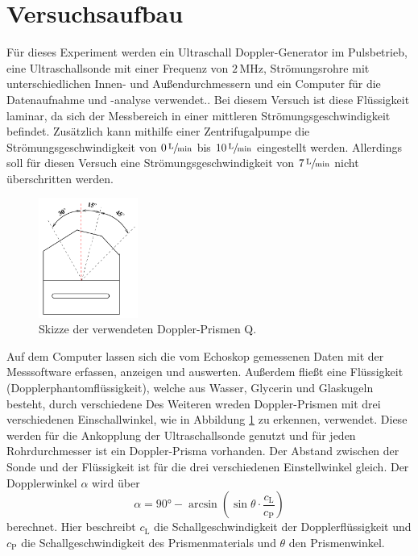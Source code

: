 \section{Versuchsaufbau}
\label{sec:Versuchsaufbau}
Für dieses Experiment werden ein Ultraschall Doppler-Generator im Pulsbetrieb, eine Ultraschallsonde mit einer Frequenz von $2\,\unit{\mega\hertz}$,
Strömungsrohre mit unterschiedlichen Innen- und Außendurchmessern und ein Computer für die Datenaufnahme und -analyse verwendet.. Bei diesem Versuch ist diese Flüssigkeit laminar, da sich der Messbereich in einer mittleren
Strömungsgeschwindigkeit befindet. Zusätzlich kann mithilfe einer Zentrifugalpumpe die Strömungsgeschwindigkeit von $0\,\sfrac{\unit{\liter}}{\unit{\minute}}$ bis $10\,\sfrac{\unit{\liter}}{\unit{\minute}}$
eingestellt werden. Allerdings soll für diesen Versuch eine Strömungsgeschwindigkeit von $7\,\sfrac{\unit{\liter}}{\unit{\minute}}$ nicht überschritten werden. 
\begin{figure}
    \centering
    \includegraphics[width=0.29\textwidth]{content/Bilder/Prisma.jpeg}
    \caption{Skizze der verwendeten Doppler-Prismen Q\cite{anleitungUS3}.}
    \label{fig:Prisma}
\end{figure}
Auf dem Computer lassen sich die vom Echoskop gemessenen Daten 
mit der Messsoftware erfassen, anzeigen und auswerten.  Außerdem fließt eine Flüssigkeit (Dopplerphantomflüssigkeit), welche aus Wasser, Glycerin und Glaskugeln besteht, durch verschiedene
Des Weiteren wreden Doppler-Prismen mit drei verschiedenen Einschallwinkel, wie in Abbildung \ref{fig:Prisma} zu erkennen, verwendet. Diese werden für die Ankopplung der Ultraschallsonde genutzt und für jeden Rohrdurchmesser
ist ein Doppler-Prisma vorhanden. Der Abstand zwischen der Sonde und der Flüssigkeit ist für die drei verschiedenen Einstellwinkel gleich. Der Dopplerwinkel $\alpha$ wird über 
\begin{equation}
    \alpha = 90°-\arcsin\left( \sin \theta \cdot \frac{c_{\text{L}}}{c_{\text{P}}}\right)
    \label{eqn:Dopplerwinkel}
\end{equation}
berechnet. Hier beschreibt $c_{\text{L}}$ die Schallgeschwindigkeit der Dopplerflüssigkeit und $c_{\text{P}}$ die Schallgeschwindigkeit des Prismenmaterials und $\theta$ den Prismenwinkel.

